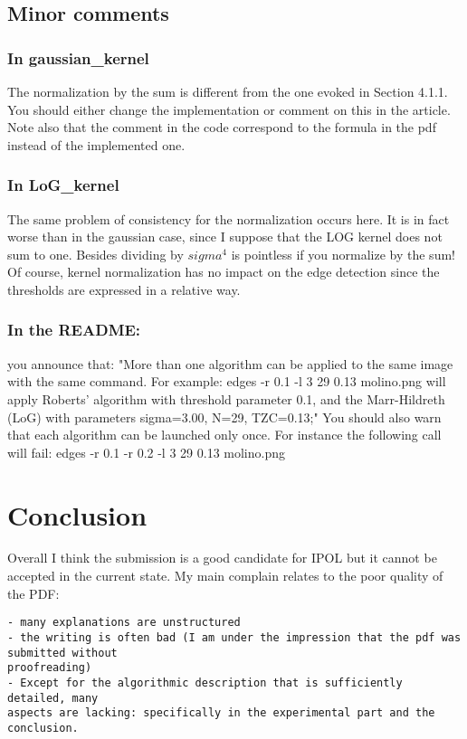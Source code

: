 \documentclass[a4paper,10pt]{report}
\begin{document}
\subsection{ Minor comments}
\subsubsection{ In gaussian\_kernel}
The normalization by the sum is different from the one evoked in Section
4.1.1. You should either change the implementation or comment on this in the article. Note
also that the comment in the code correspond to the formula in the pdf instead of the implemented one.


\subsubsection{ In LoG\_kernel }
The same problem of consistency for the normalization occurs here. It is in
fact worse than in the gaussian case, since I suppose that the LOG kernel does not sum to one. Besides dividing by $sigma^4$ is pointless if you normalize by the sum! Of course, kernel normalization has no impact on the edge detection since the thresholds are expressed in a relative way.

\subsubsection{ In the README:}
\que you announce that:
"More than one algorithm can be applied to the same image with the same
command. For example:
edges -r 0.1 -l 3 29 0.13 molino.png
will apply Roberts' algorithm with threshold parameter 0.1, and the
Marr-Hildreth (LoG) with parameters sigma=3.00, N=29, TZC=0.13;"
You should also warn that each algorithm can be launched only once. For instance
the following call will fail:
edges -r 0.1 -r 0.2 -l 3 29 0.13 molino.png

\section{ Conclusion}
Overall I think the submission is a good candidate for IPOL but it cannot be
accepted in the current state. My main complain relates to the poor quality of
the PDF:
\begin{verbatim}
- many explanations are unstructured
- the writing is often bad (I am under the impression that the pdf was submitted without
proofreading)
- Except for the algorithmic description that is sufficiently detailed, many
aspects are lacking: specifically in the experimental part and the conclusion.
\end{verbatim}




\end{document}
